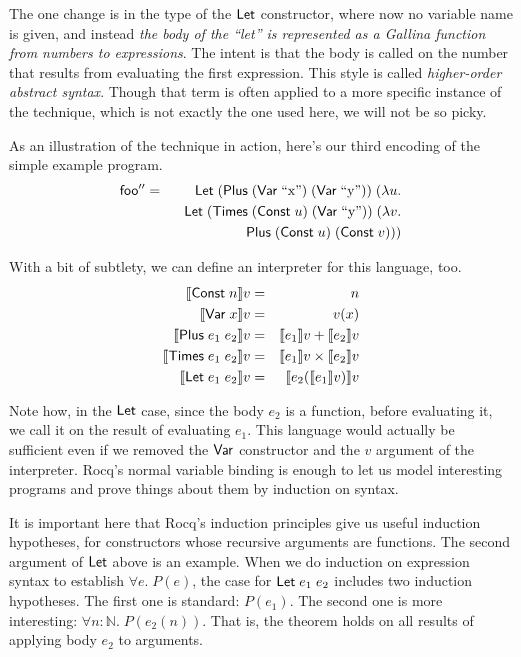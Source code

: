 \documentclass{amsbook}
\theoremstyle{definition}
\theoremstyle{remark}
\numberwithin{section}{chapter}
\numberwithin{equation}{chapter}
\begin{document}
The one change is in the type of the $\mathsf{Let}$ constructor, where now no variable name is given, and instead \emph{the body of the ``let'' is represented as a Gallina function from numbers to expressions}.
The intent is that the body is called on the number that results from evaluating the first expression.
This style is called \emph{higher-order abstract syntax}.
Though that term is often applied to a more specific instance of the technique, which is not exactly the one used here, we will not be so picky.

As an illustration of the technique in action, here's our third encoding of the simple example program.
\begin{eqnarray*}
  \mathsf{foo''} &=& \mathsf{Let} \; (\mathsf{Plus} \; (\mathsf{Var} \; \textrm{``x''}) \; (\mathsf{Var} \; \textrm{``y''})) \; (\lambda u. \\
  && \hspace{.1in} \mathsf{Let} \; (\mathsf{Times} \; (\mathsf{Const} \; u) \; (\mathsf{Var} \; \textrm{``y''})) \; (\lambda v. \\
  && \hspace{.2in} \mathsf{Plus} \; (\mathsf{Const} \; u) \; (\mathsf{Const} \; v)))
\end{eqnarray*}

With a bit of subtlety, we can define an interpreter for this language, too.
\begin{eqnarray*}
  {\left \llbracket \mathsf{Const} \; n \right \rrbracket}v &=& n \\
  {\left \llbracket \mathsf{Var} \; x \right \rrbracket}v &=& v(x) \\
  {\left \llbracket \mathsf{Plus} \; e_1 \; e_2 \right \rrbracket}v &=& {\left \llbracket e_1 \right \rrbracket}v + {\left \llbracket e_2 \right \rrbracket}v \\
  {\left \llbracket \mathsf{Times} \; e_1 \; e_2 \right \rrbracket}v &=& {\left \llbracket e_1 \right \rrbracket}v \times {\left \llbracket e_2 \right \rrbracket}v \\
  {\left \llbracket \mathsf{Let} \; e_1 \; e_2 \right \rrbracket}v &=& {\left \llbracket e_2({\left \llbracket e_1 \right \rrbracket}v) \right \rrbracket}v
\end{eqnarray*}

Note how, in the $\mathsf{Let}$ case, since the body $e_2$ is a function, before evaluating it, we call it on the result of evaluating $e_1$.
This language would actually be sufficient even if we removed the $\mathsf{Var}$ constructor and the $v$ argument of the interpreter.
Rocq's normal variable binding is enough to let us model interesting programs and prove things about them by induction on syntax.

It is important here that Rocq's induction principles give us useful induction hypotheses, for constructors whose recursive arguments are functions.
The second argument of $\mathsf{Let}$ above is an example.
When we do induction on expression syntax to establish $\forall e. \; P(e)$, the case for $\mathsf{Let} \; e_1 \; e_2$ includes two induction hypotheses.
The first one is standard: $P(e_1)$.
The second one is more interesting: $\forall n : \mathbb N. \; P(e_2(n))$.
That is, the theorem holds on all results of applying body $e_2$ to arguments.
\end{document}
